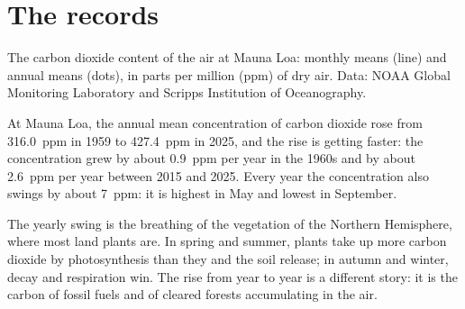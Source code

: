\section{The records}

\begin{omfigure}

{\small The carbon dioxide content of the air at Mauna Loa: monthly means
(line) and annual means (dots), in parts per million (ppm) of dry air.
Data: NOAA Global Monitoring Laboratory and Scripps Institution of
Oceanography.}
\end{omfigure}

\begin{proposition}\label{prop:g12:climate-change:co2}
At Mauna Loa, the annual mean concentration of carbon dioxide rose from
\qty{316.0}{ppm} in 1959 to \qty{427.4}{ppm} in 2025, and the rise is
getting faster: the concentration grew by about \qty{0.9}{ppm} per year in
the 1960s and by about \qty{2.6}{ppm} per year between 2015 and 2025. Every
year the concentration also swings by about \qty{7}{ppm}: it is highest in
May and lowest in September.
\end{proposition}

\begin{remark}\label{rem:g12:climate-change:teeth}
The yearly swing is the breathing of the vegetation of the Northern
Hemisphere, where most land plants are. In spring and summer, plants take
up more carbon dioxide by photosynthesis than they and the soil release;
in autumn and winter, decay and respiration win. The rise from year to
year is a different story: it is the carbon of fossil fuels and of cleared
forests accumulating in the air.
\end{remark}

